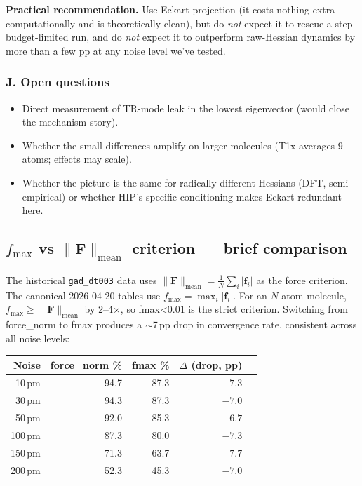 \documentclass[11pt]{article}
\begin{document}
\textbf{Practical recommendation.} Use Eckart projection (it costs
nothing extra computationally and is theoretically clean), but do
\emph{not} expect it to rescue a step-budget-limited run, and do
\emph{not} expect it to outperform raw-Hessian dynamics by more than
a few pp at any noise level we've tested.

\subsubsection*{J. Open questions}

\begin{itemize}[nosep,leftmargin=1.5em]
\item Direct measurement of TR-mode leak in the lowest eigenvector
      (would close the mechanism story).
\item Whether the small differences amplify on larger molecules (T1x
      averages 9 atoms; effects may scale).
\item Whether the picture is the same for radically different
      Hessians (DFT, semi-empirical) or whether HIP's specific
      conditioning makes Eckart redundant here.
\end{itemize}

\clearpage
\subsection{$f_{\max}$ vs $\|\mathbf{F}\|_{\text{mean}}$ criterion --- brief comparison}
\label{sec:fmax_vs_fnorm}

The historical \texttt{gad\_dt003} data uses
$\|\mathbf{F}\|_{\text{mean}} = \frac{1}{N}\sum_i |\mathbf{f}_i|$ as the
force criterion. The canonical 2026-04-20 tables use $f_{\max} = \max_i |\mathbf{f}_i|$.
For an $N$-atom molecule, $f_{\max} \geq \|\mathbf{F}\|_{\text{mean}}$ by 2--4$\times$,
so fmax<0.01 is the strict criterion. Switching from force\_norm to fmax produces a
$\sim$7\,pp drop in convergence rate, consistent across all noise levels:

\begin{center}
\begin{tabular}{rrrrr}
\toprule
Noise & force\_norm \% & fmax \% & $\Delta$ (drop, pp) \\
\midrule
10\,pm  & 94.7 & 87.3 & $-7.3$ \\
30\,pm  & 94.3 & 87.3 & $-7.0$ \\
50\,pm  & 92.0 & 85.3 & $-6.7$ \\
100\,pm & 87.3 & 80.0 & $-7.3$ \\
150\,pm & 71.3 & 63.7 & $-7.7$ \\
200\,pm & 52.3 & 45.3 & $-7.0$ \\
\bottomrule
\end{tabular}
\end{center}
\end{document}
